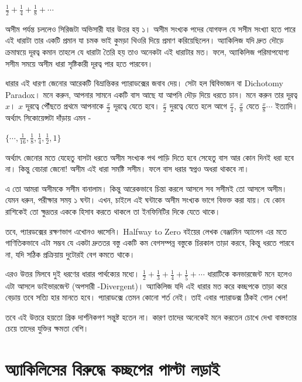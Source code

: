 \documentclass[
]{book}
\begin{document}
\(\frac 12 + \frac 14 + \frac 18 +\cdots\)

অসীম পর্যন্ত চললেও সিরিজটা অভিসারী যার উত্তর হয় ১। অসীম সংখ্যক পদের যোগফল যে সসীম সংখ্যা হতে পারে এই ধারাটা তার একটি প্রমান যা চমক ভাই কুমড়া থিওরি দিয়ে প্রমাণ করিয়েছিলেন। অ্যাকিলিজ যদি দ্রুত দৌড়ে ক্রমান্বয়ে দূরত্ব কমান তাহলে যে ধারাটা তৈরি হয় তাও অনেকটা এই ধারাটার মত। ফলে, অ্যাকিলিজ পরিমাপযোগ্য সসীম সময়ে অসীম ধারা সৃষ্টিকারী দূরত্ব পার হতে পারবেন।~

ধারার এই ধারণা জেনোর আরেকটি বিভ্রান্তিকর প্যারাডক্সের জবাব দেয়। সেটা হল দ্বিবিভাজন বা Dichotomy Paradox। মনে করুন, আপনার সামনে একটি বাস আছে যা আপনি দৌড় দিয়ে ধরতে চান। মনে করুন তার দূরত্ব \(x\)। \(x\) দূরত্বে পৌঁছতে প্রথমে আপনাকে \(\frac x2\) দূরত্বে যেতে হবে। \(\frac x2\) দুরত্বে যেতে হলে আগে \(\frac x4\), \(\frac x8\) যেতে \(\frac x8 \cdots\) ইত্যাদি। অর্থ্যাৎ সিকোয়েন্সটা দাঁড়ায় এমন -

\(\{ \cdots , \frac1{16}, \frac18, \frac14, \frac12,1 \}\)

অর্থ্যাৎ জেনোর মতে যেহেতু বাসটা ধরতে অসীম সংখ্যক পথ পাড়ি দিতে হবে সেহেতু বাস আর কোন দিনই ধরা হবে না। কিন্তু বেচারা জেনো! অসীম এই ধারা সমষ্টি সসীম। ফলে বাস ধরার স্বপ্নও অধরা থাকবে না।~

এ তো আমরা অসীমকে সসীম বানালাম। কিন্তু আরেকভাবে চিন্তা করলে আসলে সব সসীমই তো আসলে অসীম। যেমন ধরুন, পরীক্ষার সময় ১ ঘন্টা। এখন, চাইলে এই ঘন্টাকে অসীম সংখ্যক ভাগে বিভক্ত করা যায়। যে কোন রাশিকেই তো ক্ষুদ্রতর এককে হিসাব করতে থাকলে তা ইনফিনিটির দিকে যেতে থাকে।~

তবে, প্যারডক্সের রক্ষণভাগ এখোনও ধ্বসেনি। Halfway to Zero বইয়ের লেখক বেঞ্জামিন অ্যালেন এর মতে গাণিতিকভাবে এটা সম্ভব যে একটা দ্রুততর বস্তু একটি কম বেগসম্পন্ন বস্তুকে চিরকাল তাড়া করবে, কিন্তু ধরতে পারবে না, যদি সঠিক প্রক্রিয়ায় দুটোরই বেগ কমতে থাকে।~

এরও উত্তর মিলবে দুই ধরণের ধারার পার্থক্যের মধ্যে। \(\frac 12 + \frac 13 + \frac 14 + \frac 15 + \cdots\) ধারাটিকে কনভারজেন্ট মনে হলেও এটা আসলে ডাইভারজেন্ট (অপসারী -Divergent)। অ্যাকিলিজ যদি এই ধারার মত করে কচ্ছপকে তাড়া করে বেড়ায় তবে সত্যি হার মানতে হবে। প্যারাডক্সে তেমন কোনো শর্ত নেই। তাই এবার প্যারাডক্স ঠিকই গোল খেল!~

তবে এই উত্তরে হয়তো গ্রিক দার্শনিকগণ সন্তুষ্ট হতেন না। কারণ তাদের অনেকেই মনে করতেন চোখে দেখা বাস্তবতার চেয়ে তাদের যুক্তির ক্ষমতা বেশি। ~

\hypertarget{achilles-2}{%
\chapter{অ্যাকিলিসের বিরুদ্ধে কচ্ছপের পাল্টা লড়াই}\label{achilles-2}}
\end{document}

